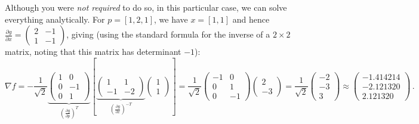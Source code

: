 \documentclass[10pt,oneside]{article}
\begin{document}
\begin{enumerate}
Although you were \emph{not required} to do so, in this particular case, we can solve everything analytically. For $p = [1,2,1]$, we have $x = [1,1]$ and hence $\frac{\partial g}{\partial x}= \begin{pmatrix} 2 & -1 \\  1 & -1 \end{pmatrix} $, giving (using the standard formula for the inverse of a $2 \times 2$ matrix, noting that this matrix has determinant $-1$):
 $$
 \nabla f = -\frac{1}{\sqrt{2}}\underbrace{\begin{pmatrix}
     1 & 0 \\ 0 & -1 \\ 0 & 1
     \end{pmatrix}}_{\left(\frac{\partial g}{\partial p}\right)^T} \left[ \underbrace{\begin{pmatrix}
     1 & 1 \\ -1 & -2
     \end{pmatrix}}_{\left(\frac{\partial g}{\partial x} \right)^{-T}} 
     \begin{pmatrix}
     1 \\ 1
     \end{pmatrix}
      \right] = \frac{1}{\sqrt{2}} \begin{pmatrix}
     -1 & 0 \\ 0 & 1 \\ 0 & -1
     \end{pmatrix} \begin{pmatrix}
     2 \\ -3 
     \end{pmatrix} = \boxed{\frac{1}{\sqrt{2}} \begin{pmatrix}
     -2 \\ -3 \\ 3 
     \end{pmatrix} \approx \begin{pmatrix}
      -1.414214 \\
 -2.121320 \\
  2.121320
     \end{pmatrix}} \, .
 $$
\end{enumerate}
\end{document}
